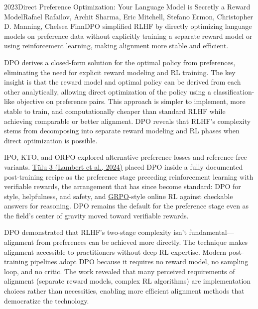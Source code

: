 
\begin{papersummary}{2023}{Direct Preference Optimization: Your Language Model is Secretly a Reward Model}{Rafael Rafailov, Archit Sharma, Eric Mitchell, Stefano Ermon, Christopher D. Manning, Chelsea Finn}{DPO simplified RLHF by directly optimizing language models on preference data without explicitly training a separate reward model or using reinforcement learning, making alignment more stable and efficient.}

DPO derives a closed-form solution for the optimal policy from preferences, eliminating the need for explicit reward modeling and RL training. The key insight is that the reward model and optimal policy can be derived from each other analytically, allowing direct optimization of the policy using a classification-like objective on preference pairs. This approach is simpler to implement, more stable to train, and computationally cheaper than standard RLHF while achieving comparable or better alignment. DPO reveals that RLHF's complexity stems from decomposing into separate reward modeling and RL phases when direct optimization is possible.

IPO, KTO, and ORPO explored alternative preference losses and reference-free variants. \hyperref[paper:lambert-2024-tulu3]{T\"ulu 3 (Lambert et al., 2024)} placed DPO inside a fully documented post-training recipe as the preference stage preceding reinforcement learning with verifiable rewards, the arrangement that has since become standard: DPO for style, helpfulness, and safety, and \hyperref[paper:shao-2024-grpo]{GRPO}-style online RL against checkable answers for reasoning. DPO remains the default for the preference stage even as the field's center of gravity moved toward verifiable rewards.

DPO demonstrated that RLHF's two-stage complexity isn't fundamental—alignment from preferences can be achieved more directly. The technique makes alignment accessible to practitioners without deep RL expertise. Modern post-training pipelines adopt DPO because it requires no reward model, no sampling loop, and no critic. The work revealed that many perceived requirements of alignment (separate reward models, complex RL algorithms) are implementation choices rather than necessities, enabling more efficient alignment methods that democratize the technology.

\end{papersummary}
